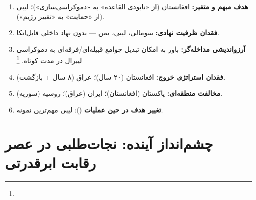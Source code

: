 \begin{tcolorbox}[failbox, title={عوامل مشترک مداخلات شکست‌خورده (D–F)}]
\begin{enumerate}[nosep, label=\textbf{\arabic*.}]
  \item \textbf{هدف مبهم و متغیر:} افغانستان (از «نابودی القاعده» به «دموکراسی‌سازی»)؛ لیبی (از «حمایت» به «تغییر رژیم»).
  \item \textbf{فقدان ظرفیت نهادی:} سومالی، لیبی، یمن — بدون نهاد داخلی قابل‌اتکا.
  \item \textbf{آرزواندیشی مداخله‌گر:} باور به امکان تبدیل جوامع قبیله‌ای/فرقه‌ای به دموکراسی لیبرال در مدت کوتاه.%
  \footnote{}
  \item \textbf{فقدان استراتژی خروج:} افغانستان (۲۰ سال)؛ عراق (۸ سال + بازگشت).
  \item \textbf{مخالفت منطقه‌ای:} پاکستان (افغانستان)؛ ایران (عراق)؛ روسیه (سوریه).
  \item \textbf{تغییر هدف در حین عملیات} (): لیبی مهم‌ترین نمونه.
\end{enumerate}
\end{tcolorbox}

\section{چشم‌انداز آینده: نجات‌طلبی در عصر رقابت ابرقدرتی}
\label{sec:ch10-future}

